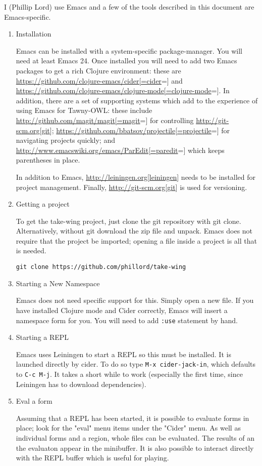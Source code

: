 \documentclass[11pt]{article}
\begin{document}
I (Phillip Lord) use Emacs and a few of the tools described in this
document are Emacs-specific.

\begin{enumerate}
\item Installation
\label{sec-6-1-1-1}

Emacs can be installed with a system-specific package-manager. You will
need at least Emacs 24. Once installed you will need to add two Emacs
packages to get a rich Clojure environment: these are
\url{https://github.com/clojure-emacs/cider[=cider}=] and
\url{https://github.com/clojure-emacs/clojure-mode[=clojure-mode}=]. In
addition, there are a set of supporting systems which add to the
experience of using Emacs for Tawny-OWL: these include
\url{http://github.com/magit/magit[=magit}=] for controlling
\url{http://git-scm.org[git}];
\url{https://github.com/bbatsov/projectile[=projectile}=] for navigating
projects quickly; and \url{http://www.emacswiki.org/emacs/ParEdit[=paredit}=]
which keeps parentheses in place.

In addition to Emacs, \url{http://leiningen.org[leiningen}] needs to be
installed for project management. Finally, \url{http://git-scm.org[git}] is
used for versioning.

\item Getting a project
\label{sec-6-1-1-2}

To get the take-wing project, just clone the git repository with git
clone. Alternatively, without git download the zip file and unpack.
Emacs does not require that the project be imported; opening a file
inside a project is all that is needed.

\begin{verbatim}
git clone https://github.com/phillord/take-wing
\end{verbatim}


\item Starting a New Namespace
\label{sec-6-1-1-3}

Emacs does not need specific support for this. Simply open a new file.
If you have installed Clojure mode and Cider correctly, Emacs will
insert a namespace form for you. You will need to add \texttt{:use} statement
by hand.

\item Starting a REPL
\label{sec-6-1-1-4}

Emacs uses Leiningen to start a REPL so this must be installed. It is
launched directly by cider. To do so type \texttt{M-x cider-jack-in}, which
defaults to \texttt{C-c M-j}. It takes a short while to work (especially the
first time, since Leiningen has to download dependencies).

\item Eval a form
\label{sec-6-1-1-5}

Assuming that a REPL has been started, it is possible to evaluate forms
in place; look for the "eval" menu items under the "Cider" menu. As well
as individual forms and a region, whole files can be evaluated. The
results of an the evaluaton appear in the minibuffer. It is also
possible to interact directly with the REPL buffer which is useful for
playing.
\end{enumerate}
\end{document}
